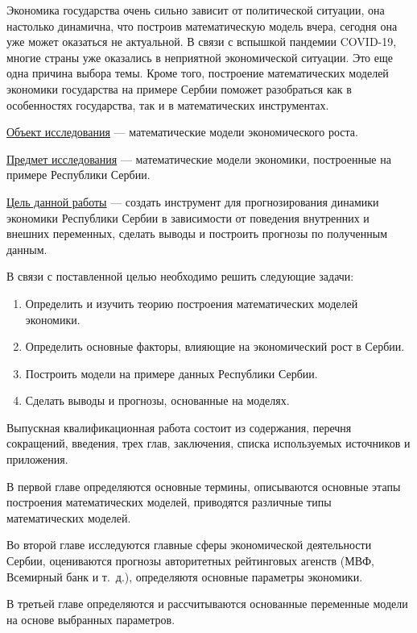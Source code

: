 Экономика государства очень сильно зависит от политической ситуации, она настолько динамична, что построив математическую модель вчера, сегодня она уже может оказаться не актуальной. В связи с вспышкой пандемии COVID-19, многие страны уже оказались в неприятной экономической ситуации.
Это еще одна причина выбора темы.
Кроме того, построение математических моделей экономики государства на примере Сербии поможет разобраться как в особенностях государства, так и в математических инструментах.

\underline{Объект исследования} --- математические модели экономического роста.

\underline{Предмет исследования} --- математические модели экономики, построенные на примере Республики Сербии.

\underline{Цель данной работы} --- создать инструмент для прогнозирования динамики экономики Республики Сербии в зависимости от поведения внутренних и внешних переменных, сделать выводы и построить прогнозы по полученным данным.

В связи с поставленной целью необходимо решить следующие задачи:
\begin{enumerate}
	\item Определить и изучить теорию построения математических моделей экономики.
	\item Определить основные факторы, влияющие на экономический рост в Сербии.
	\item Построить модели на примере данных Республики Сербии.
	\item Сделать выводы и прогнозы, основанные на моделях.
\end{enumerate}

Выпускная квалификационная работа состоит из содержания, перечня сокращений, введения, трех глав, заключения, списка используемых источников и приложения.

В первой главе определяются основные термины, описываются основные этапы построения математических моделей, приводятся различные типы математических моделей.

Во второй главе исследуются главные сферы экономической деятельности Сербии, оцениваются прогнозы авторитетных рейтинговых агенств (МВФ, Всемирный банк и т.~д.), определяютя основные параметры экономики.

В третьей главе определяются и рассчитываются основанные переменные модели на основе выбранных параметров.

